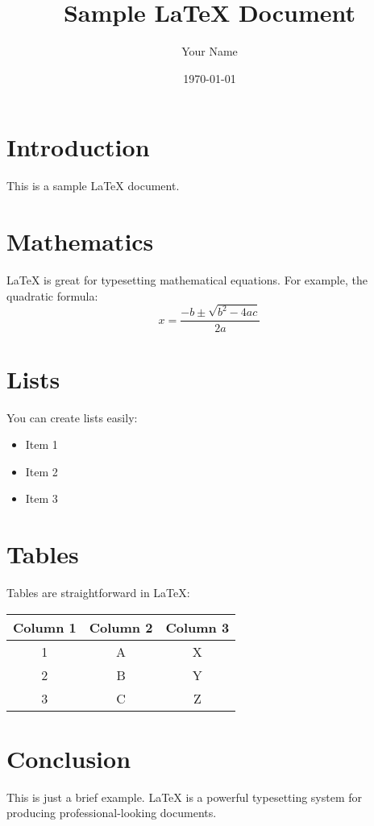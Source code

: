 \documentclass{article}
\begin{document}
\title{Sample LaTeX Document}
\author{Your Name}
\date{\today}

\maketitle

\section{Introduction}
This is a sample LaTeX document.

\section{Mathematics}
LaTeX is great for typesetting mathematical equations. For example, the quadratic formula:
\[
x = \frac{-b \pm \sqrt{b^2 - 4ac}}{2a}
\]

\section{Lists}
You can create lists easily:
\begin{itemize}
  \item Item 1
  \item Item 2
  \item Item 3
\end{itemize}

\section{Tables}
Tables are straightforward in LaTeX:
\begin{tabular}{|c|c|c|}
  \hline
  Column 1 & Column 2 & Column 3 \\
  \hline
  1 & A & X \\
  2 & B & Y \\
  3 & C & Z \\
  \hline
\end{tabular}

\section{Conclusion}
This is just a brief example. LaTeX is a powerful typesetting system for producing professional-looking documents.
\end{document}
